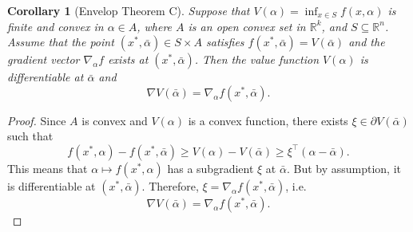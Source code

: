 \documentclass[12pt,a4paper]{report}
\numberwithin{equation}{section}
\theoremstyle{mystyle}
\newtheorem{corollary}[definition]{Corollary}
\newcommand{\R}{\mathbb{R}}
\newcommand{\grad}{\nabla}
\newcommand{\T}{\top}
\begin{document}
	\begin{corollary}[Envelop Theorem C]
		Suppose that $V(\alpha)=\inf_{x\in S}f(x,\alpha)$ is finite and convex in $\alpha\in A$, where $A$ is an open convex set in $\R^k$, and $S\subseteq \R^n$. Assume that the point $(x^*,\bar{\alpha})\in S\times A$ satisfies $f(x^*,\bar{\alpha})=V(\bar{\alpha})$ and the gradient vector $\grad_\alpha f$ exists at $(x^*,\bar{\alpha})$. Then the value function $V(\alpha)$ is differentiable at $\bar{\alpha}$ and 
		$$
		\grad V(\bar{\alpha})=\grad_\alpha f(x^*,\bar{\alpha}).
		$$
	\end{corollary}
	\begin{proof}
		Since $A$ is convex and $V(\alpha)$ is a convex function, there exists $\xi\in \partial V(\bar{\alpha})$ such that
		$$
		f(x^*,\alpha)-f(x^*,\bar{\alpha})\geq V(\alpha)-V(\bar{\alpha})\geq \xi^\T (\alpha-\bar{\alpha}).
		$$
		This means that $\alpha\mapsto f(x^*,\alpha)$ has a subgradient $\xi$ at $\bar{\alpha}$. But by assumption, it is differentiable at $(x^*,\bar{\alpha})$. Therefore, $\xi=\grad_\alpha f(x^*,\bar{\alpha})$, i.e.
		$$
		\grad V(\bar{\alpha})=\grad_\alpha f(x^*,\bar{\alpha}).
		$$
	\end{proof}
\end{document}
